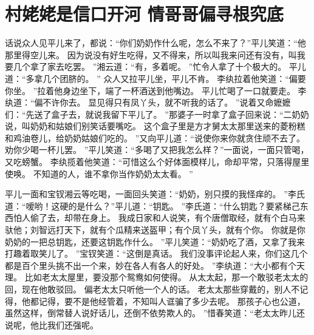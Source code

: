 \chapter{村姥姥是信口开河 \quad 情哥哥偏寻根究底}
\par
话说众人见平儿来了，都说：“你们奶奶作什么呢，怎么不来了？”平儿笑道：“他那里得空儿来。
因为说没有好生吃得，又不得来，所以叫我来问还有没有，叫我要几个拿了家去吃罢。
”湘云道：“有，多着呢。
”忙令人拿了十个极大的。
平儿道：“多拿几个团脐的。
”
众人又拉平儿坐，平儿不肯。
李纨拉着他笑道：“偏要你坐。
”拉着他身边坐下，端了一杯酒送到他嘴边。
平儿忙喝了一口就要走。
李纨道：“偏不许你去。
显见得只有凤丫头，就不听我的话了。
”说着又命嬷嬷们：“先送了盒子去，就说我留下平儿了。
”那婆子一时拿了盒子回来说：“二奶奶说，叫奶奶和姑娘们别笑话要嘴吃。
这个盒子里是方才舅太太那里送来的菱粉糕和鸡油卷儿，给奶奶姑娘们吃的。
”又向平儿道：“说使你来你就贪住顽不去了。
劝你少喝一杯儿罢。
”平儿笑道：“多喝了又把我怎么样？”一面说，一面只管喝，又吃螃蟹。
李纨揽着他笑道：“可惜这么个好体面模样儿，命却平常，只落得屋里使唤。
不知道的人，谁不拿你当作奶奶太太看。
”\par
平儿一面和宝钗湘云等吃喝，一面回头笑道：“奶奶，别只摸的我怪痒的。
”李氏道：“嗳哟！这硬的是什么？”平儿道：“钥匙。
”李氏道：“什么钥匙？要紧梯己东西怕人偷了去，却带在身上。
我成日家和人说笑，有个唐僧取经，就有个白马来驮他；刘智远打天下，就有个瓜精来送盔甲；有个凤丫头，就有个你。
你就是你奶奶的一把总钥匙，还要这钥匙作什么。
”平儿笑道：“奶奶吃了酒，又拿了我来打趣着取笑儿了。
”宝钗笑道：“这倒是真话。
我们没事评论起人来，你们这几个都是百个里头挑不出一个来，妙在各人有各人的好处。
”李纨道：“大小都有个天理。
比如老太太屋里，要没那个鸳鸯如何使得。
从太太起，那一个敢驳老太太的回，现在他敢驳回。
偏老太太只听他一个人的话。
老太太那些穿戴的，别人不记得，他都记得，要不是他经管着，不知叫人诓骗了多少去呢。
那孩子心也公道，虽然这样，倒常替人说好话儿，还倒不依势欺人的。
”惜春笑道：“老太太昨儿还说呢，他比我们还强呢。
